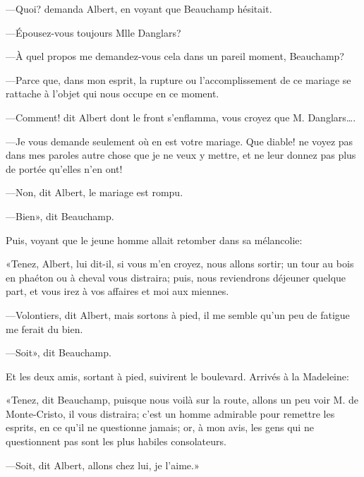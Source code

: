 —Quoi? demanda Albert, en voyant que Beauchamp hésitait. 

—Épousez-vous toujours Mlle Danglars? 

—À quel propos me demandez-vous cela dans un pareil moment, Beauchamp? 

—Parce que, dans mon esprit, la rupture ou l'accomplissement de ce mariage se rattache à l'objet qui nous occupe en ce moment. 

—Comment! dit Albert dont le front s'enflamma, vous croyez que M. Danglars\dots. 

—Je vous demande seulement où en est votre mariage. Que diable! ne voyez pas dans mes paroles autre chose que je ne veux y mettre, et ne leur donnez pas plus de portée qu'elles n'en ont! 

—Non, dit Albert, le mariage est rompu. 

—Bien», dit Beauchamp. 

Puis, voyant que le jeune homme allait retomber dans sa mélancolie: 

«Tenez, Albert, lui dit-il, si vous m'en croyez, nous allons sortir; un tour au bois en phaéton ou à cheval vous distraira; puis, nous reviendrons déjeuner quelque part, et vous irez à vos affaires et moi aux miennes. 

—Volontiers, dit Albert, mais sortons à pied, il me semble qu'un peu de fatigue me ferait du bien. 

—Soit», dit Beauchamp. 

Et les deux amis, sortant à pied, suivirent le boulevard. Arrivés à la Madeleine: 

«Tenez, dit Beauchamp, puisque nous voilà sur la route, allons un peu voir M. de Monte-Cristo, il vous distraira; c'est un homme admirable pour remettre les esprits, en ce qu'il ne questionne jamais; or, à mon avis, les gens qui ne questionnent pas sont les plus habiles consolateurs. 

—Soit, dit Albert, allons chez lui, je l'aime.» 